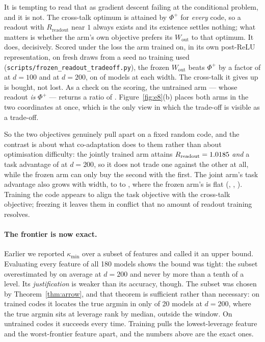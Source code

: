 It is tempting to read that as gradient descent failing at the conditional problem, and it is not.
The cross-talk optimum is attained by $\Phi^{+}$ for \emph{every} code, so a readout with
$R_{\mathrm{readout}}$ near $1$ always exists and its existence settles nothing; what matters is
whether the arm's own objective prefers its $W_{\mathrm{out}}$ to that optimum. It does, decisively.
Scored under the loss the arm trained on, in its own post-ReLU representation, on fresh draws from a
seed no training used (\texttt{scripts/frozen\_readout\_tradeoff.py}), the frozen
$W_{\mathrm{out}}$ beats $\Phi^{+}$ by a factor of \EeightFrozenHundredTaskGain{} at $d=100$ and
\EeightFrozenTwoHundredTaskGain{} at $d=200$, on \EeightFrozenTwoHundredTaskWins{} of
\EeightSeeds{} models at each width. The cross-talk it gives up is bought, not lost. As a check on
the scoring, the untrained arm --- whose readout \emph{is} $\Phi^{+}$ --- returns a ratio of
\EeightRandomTwoHundredTaskGain{}. Figure~\ref{fig:e8}(b) places both arms in the two coordinates at
once, which is the only view in which the trade-off is visible as a trade-off.

So the two objectives genuinely pull apart on a fixed random code, and the contrast is about what
co-adaptation does to them rather than about optimisation difficulty: the jointly trained arm attains
$R_{\mathrm{readout}}=1.0185{}$ \emph{and} a task advantage of
\EeightTrainedTwoHundredTaskGain{} at $d=200$, so it does not trade one against the other at all,
while the frozen arm can only buy the second with the first. The joint arm's task advantage also
grows with width, \EeightTrainedFiftyTaskGain{} to \EeightTrainedHundredTaskGain{} to
\EeightTrainedTwoHundredTaskGain{}, where the frozen arm's is flat
(\EeightFrozenFiftyTaskGain{}, \EeightFrozenHundredTaskGain{},
\EeightFrozenTwoHundredTaskGain{}). Training the code appears to align the task objective with the
cross-talk objective; freezing it leaves them in conflict that no amount of readout training
resolves.

\paragraph{The frontier is now exact.} Earlier we reported $\kappa_{\min}$ over a subset of features
and called it an upper bound. Evaluating every feature of all 180 models shows the bound was tight:
the subset overestimated by \FullLfourTwoHundredSubsetOver{} on average at $d=200$ and never by more
than a tenth of a level. Its \emph{justification} is weaker than its accuracy, though. The subset was
chosen by Theorem~\ref{thm:arrow}, and that theorem is sufficient rather than necessary: on trained
codes it locates the true argmin in only \FullLfourTwoHundredArgminFound{} of 20 models at $d=200$,
where the true argmin sits at leverage rank \FullLfourTwoHundredArgminRankMed{} by median, outside
the window. On untrained codes it succeeds every time. Training pulls the lowest-leverage feature and
the worst-frontier feature apart, and the numbers above are the exact ones.

